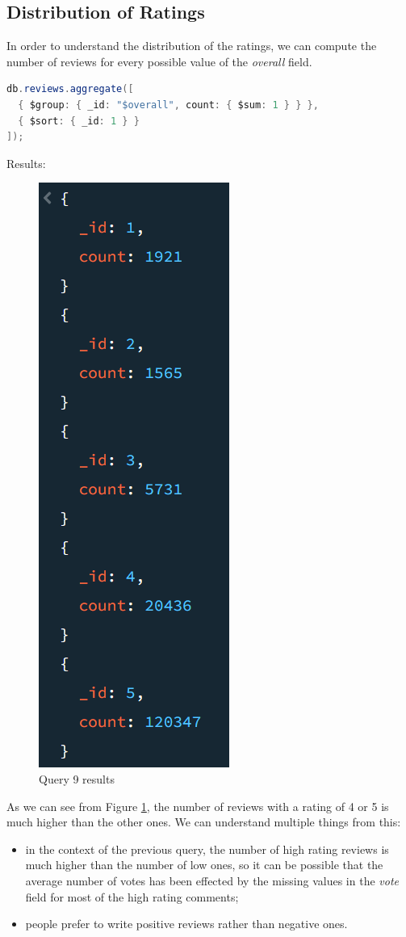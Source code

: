 \subsection{Distribution of Ratings}
In order to understand the distribution of the ratings, we can compute the number of reviews for every possible value of the \textit{overall} field. \\
\begin{lstlisting}[language=Java]
db.reviews.aggregate([
  { $group: { _id: "$overall", count: { $sum: 1 } } },
  { $sort: { _id: 1 } }
]);
\end{lstlisting}
Results:
\begin{figure}[H]
  \centering
  \includegraphics[scale=0.6]{Images/q9_result.png}
  \caption{Query 9 results}
  \label{fig:q9_result}
\end{figure}
As we can see from Figure \ref{fig:q9_result}, the number of reviews with a rating of 4 or 5 is much higher than the other ones.
We can understand multiple things from this:
\begin{itemize}
    \item in the context of the previous query, the number of high rating reviews is much higher than the number of low ones, so it can be possible that the average number of votes has been effected by the missing values in the \textit{vote} field for most of the high rating comments;
    \item people prefer to write positive reviews rather than negative ones.
\end{itemize}

